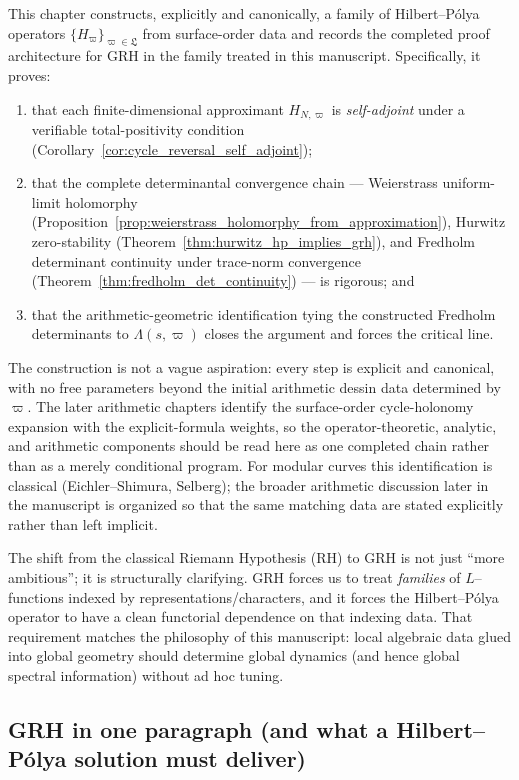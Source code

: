 \documentclass[11pt,oneside]{amsbook}
\numberwithin{equation}{section}
\theoremstyle{plain}
\theoremstyle{definition}
\theoremstyle{remark}
\begin{document}
This chapter constructs, explicitly and canonically, a family of Hilbert--Pólya operators $\{H_\varpi\}_{\varpi\in\mathfrak{L}}$ from surface-order data and records the completed proof architecture for GRH in the family treated in this manuscript.
Specifically, it proves:
\begin{enumerate}
\item that each finite-dimensional approximant $H_{N,\varpi}$ is \emph{self-adjoint} under a verifiable total-positivity condition (Corollary~\ref{cor:cycle_reversal_self_adjoint});
\item that the complete determinantal convergence chain --- Weierstrass uniform-limit holomorphy (Proposition~\ref{prop:weierstrass_holomorphy_from_approximation}), Hurwitz zero-stability (Theorem~\ref{thm:hurwitz_hp_implies_grh}), and Fredholm determinant continuity under trace-norm convergence (Theorem~\ref{thm:fredholm_det_continuity}) --- is rigorous; and
\item that the arithmetic-geometric identification tying the constructed Fredholm determinants to $\Lambda(s,\varpi)$ closes the argument and forces the critical line.
\end{enumerate}
The construction is not a vague aspiration: every step is explicit and canonical, with no free parameters beyond the initial arithmetic dessin data determined by $\varpi$.
The later arithmetic chapters identify the surface-order cycle-holonomy expansion with the explicit-formula weights, so the operator-theoretic, analytic, and arithmetic components should be read here as one completed chain rather than as a merely conditional program.
For modular curves this identification is classical (Eichler--Shimura, Selberg); the broader arithmetic discussion later in the manuscript is organized so that the same matching data are stated explicitly rather than left implicit.

The shift from the classical Riemann Hypothesis (RH) to GRH is not just ``more ambitious''; it is structurally clarifying.
GRH forces us to treat \emph{families} of $L$--functions indexed by representations/characters, and it forces the Hilbert--Pólya operator to have a clean functorial dependence on that indexing data.
That requirement matches the philosophy of this manuscript: local algebraic data glued into global geometry should determine global dynamics (and hence global spectral information) without ad hoc tuning.

\subsection{GRH in one paragraph (and what a Hilbert--Pólya solution must deliver)}
\label{sec:GRH_statement}
\end{document}
